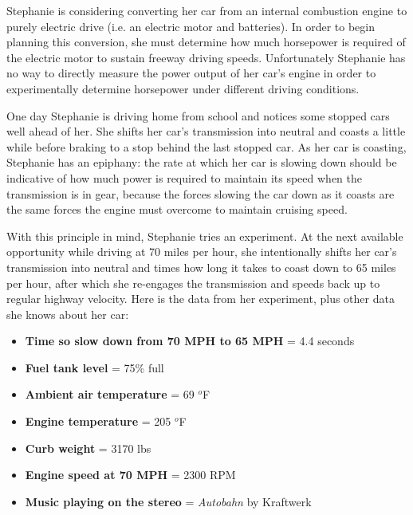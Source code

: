 

Stephanie is considering converting her car from an internal combustion engine to purely electric drive (i.e. an electric motor and batteries).  In order to begin planning this conversion, she must determine how much horsepower is required of the electric motor to sustain freeway driving speeds.  Unfortunately Stephanie has no way to directly measure the power output of her car's engine in order to experimentally determine horsepower under different driving conditions.

\vskip 10pt

One day Stephanie is driving home from school and notices some stopped cars well ahead of her.  She shifts her car's transmission into neutral and coasts a little while before braking to a stop behind the last stopped car.  As her car is coasting, Stephanie has an epiphany: the rate at which her car is slowing down should be indicative of how much power is required to maintain its speed when the transmission is in gear, because the forces slowing the car down as it coasts are the same forces the engine must overcome to maintain cruising speed.  

\vskip 10pt

With this principle in mind, Stephanie tries an experiment.  At the next available opportunity while driving at 70 miles per hour, she intentionally shifts her car's transmission into neutral and times how long it takes to coast down to 65 miles per hour, after which she re-engages the transmission and speeds back up to regular highway velocity.  Here is the data from her experiment, plus other data she knows about her car:  

\begin{itemize}
\item{} {\bf Time so slow down from 70 MPH to 65 MPH} = 4.4 seconds
\item{} {\bf Fuel tank level} = 75\% full
\item{} {\bf Ambient air temperature} = 69 $^{o}$F
\item{} {\bf Engine temperature} = 205 $^{o}$F
\item{} {\bf Curb weight} = 3170 lbs
\item{} {\bf Engine speed at 70 MPH} = 2300 RPM
\item{} {\bf Music playing on the stereo} = {\it Autobahn} by Kraftwerk
\end{itemize}

